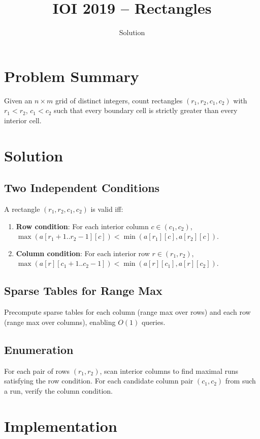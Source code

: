 \documentclass[11pt,a4paper]{article}
\title{IOI 2019 -- Rectangles}
\author{Solution}
\date{}
\begin{document}
\maketitle

\section{Problem Summary}
Given an $n \times m$ grid of distinct integers, count rectangles $(r_1, r_2, c_1, c_2)$ with $r_1 < r_2$, $c_1 < c_2$ such that every boundary cell is strictly greater than every interior cell.

\section{Solution}

\subsection{Two Independent Conditions}
A rectangle $(r_1, r_2, c_1, c_2)$ is valid iff:
\begin{enumerate}
  \item \textbf{Row condition}: For each interior column $c \in (c_1, c_2)$, $\max(a[r_1+1..r_2-1][c]) < \min(a[r_1][c], a[r_2][c])$.
  \item \textbf{Column condition}: For each interior row $r \in (r_1, r_2)$, $\max(a[r][c_1+1..c_2-1]) < \min(a[r][c_1], a[r][c_2])$.
\end{enumerate}

\subsection{Sparse Tables for Range Max}
Precompute sparse tables for each column (range max over rows) and each row (range max over columns), enabling $O(1)$ queries.

\subsection{Enumeration}
For each pair of rows $(r_1, r_2)$, scan interior columns to find maximal runs satisfying the row condition. For each candidate column pair $(c_1, c_2)$ from such a run, verify the column condition.

\section{Implementation}
\end{document}
